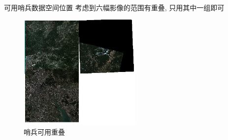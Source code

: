 \begin{frame}{可用哨兵数据空间位置}
    \small
    考虑到六幅影像的范围有重叠, 只用其中一组即可
    \begin{figure}
        \centering
        \includegraphics[width=6cm]{pic/pic0115.jpg}
        \caption{哨兵可用重叠}
        \label{fig:0109}
    \end{figure}
\end{frame}